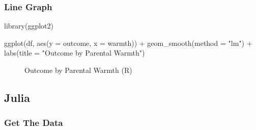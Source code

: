 \documentclass[
  letterpaper,
  DIV=11,
  numbers=noendperiod]{scrreprt}
\newenvironment{Shaded}{\begin{snugshade}}{\end{snugshade}}
\newcommand{\AttributeTok}[1]{\textcolor[rgb]{0.40,0.45,0.13}{#1}}
\newcommand{\FunctionTok}[1]{\textcolor[rgb]{0.28,0.35,0.67}{#1}}
\newcommand{\NormalTok}[1]{\textcolor[rgb]{0.00,0.23,0.31}{#1}}
\newcommand{\SpecialCharTok}[1]{\textcolor[rgb]{0.37,0.37,0.37}{#1}}
\newcommand{\StringTok}[1]{\textcolor[rgb]{0.13,0.47,0.30}{#1}}
\begin{document}
\subsubsection{Line Graph}\label{line-graph-1}

\begin{Shaded}
\begin{Highlighting}[]
\FunctionTok{library}\NormalTok{(ggplot2)}

\FunctionTok{ggplot}\NormalTok{(df,}
       \FunctionTok{aes}\NormalTok{(}\AttributeTok{y =}\NormalTok{ outcome,}
           \AttributeTok{x =}\NormalTok{ warmth)) }\SpecialCharTok{+}
  \FunctionTok{geom\_smooth}\NormalTok{(}\AttributeTok{method =} \StringTok{"lm"}\NormalTok{) }\SpecialCharTok{+}
\FunctionTok{labs}\NormalTok{(}\AttributeTok{title =} \StringTok{"Outcome by Parental Warmth"}\NormalTok{)}
\end{Highlighting}
\end{Shaded}

\begin{figure}[H]


\caption{\label{fig-Rlfit}Outcome by Parental Warmth (R)}

\end{figure}%

\subsection{Julia}

\subsubsection{Get The Data}\label{get-the-data-5}
\end{document}
